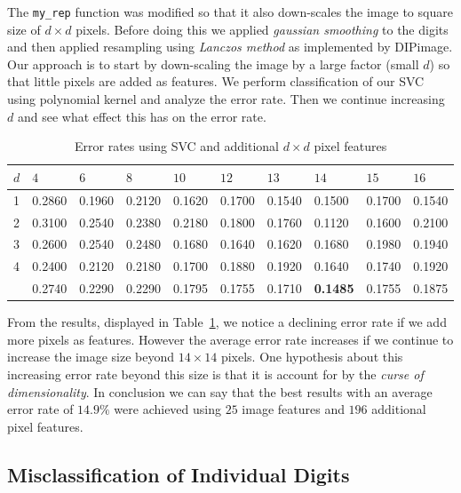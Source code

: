 \documentclass{article}
\begin{document}
The \texttt{my\_rep} function was modified so that it also down-scales the image to square size of $d \times d$ pixels. Before doing this we applied \emph{gaussian smoothing} to the digits and then applied resampling using \emph{Lanczos method} \cite{lanczos-filtering} as implemented by DIPimage. Our approach is to start by down-scaling the image by a large factor (small $d$) so that little pixels are added as features. We perform classification of our SVC using polynomial kernel and analyze the error rate. Then we continue increasing $d$ and see what effect this has on the error rate.

\begin{table}[H]
    \centering
    \begin{tabular}{|l|lllllllll|}
    \hline
    $d$ & $4$ & $6$ & $8$ & $10$ & $12$ & $13$ & $14$ & $15$ & $16$ \\
    \hline
    1 & 0.2860 & 0.1960 & 0.2120 & 0.1620 & 0.1700 & 0.1540 & 0.1500 & 0.1700 & 0.1540 \\
    2 & 0.3100 & 0.2540 & 0.2380 & 0.2180 & 0.1800 & 0.1760 & 0.1120 & 0.1600 & 0.2100 \\
    3 & 0.2600 & 0.2540 & 0.2480 & 0.1680 & 0.1640 & 0.1620 & 0.1680 & 0.1980 & 0.1940 \\
    4 & 0.2400 & 0.2120 & 0.2180 & 0.1700 & 0.1880 & 0.1920 & 0.1640 & 0.1740 & 0.1920 \\
    \hline
      & 0.2740 & 0.2290 & 0.2290 & 0.1795 & 0.1755 & 0.1710 & \textbf{0.1485} & 0.1755 & 0.1875 \\ 
    \hline
    \end{tabular}
    \caption{Error rates using SVC and additional $d \times d$ pixel features \label{tab:svc-adding-pixel-features}}
\end{table}

From the results, displayed in Table~\ref{tab:svc-adding-pixel-features}, we notice a declining error rate if we add more pixels as features. However the average error rate increases if we continue to increase the image size beyond $14 \times 14$ pixels. One hypothesis about this increasing error rate beyond this size is that it is account for by the \emph{curse of dimensionality}. In conclusion we can say that the best results with an average error rate of $\mathbf{14.9 \%}$ were achieved using $25$ image features and $196$ additional pixel features. 

\subsection{Misclassification of Individual Digits}
\end{document}
